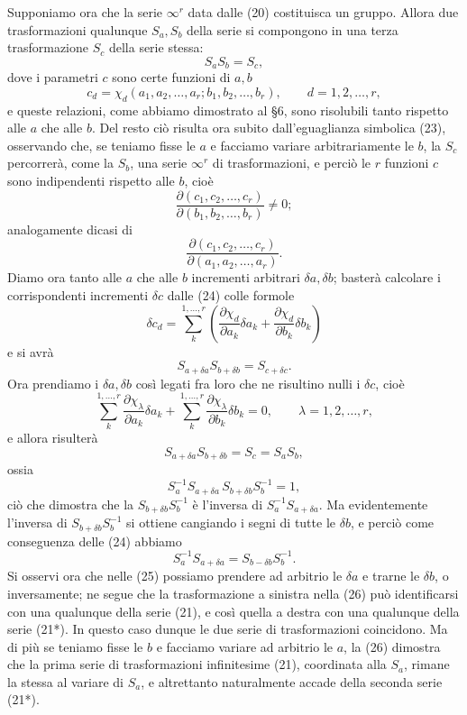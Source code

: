 \documentclass[11pt]{book}
\begin{document}
Supponiamo ora che la serie $\infty^r$ data dalle (20) costituisca un gruppo. Allora due trasformazioni qualunque $S_a,S_b$ della serie si compongono in una terza trasformazione $S_c$ della serie stessa:
\begin{equation*}\tag{23}
 S_aS_b=S_c,
\end{equation*}
dove i parametri $c$ sono certe funzioni di $a,b$
\begin{equation*}\tag{24}
 c_d=\chi_d(a_1,a_2,\ldots,a_r; b_1,b_2,\ldots,b_r),\qquad d=1,2,\ldots,r,
\end{equation*}
e queste relazioni, come abbiamo dimostrato al \S{}6, sono risolubili tanto rispetto alle $a$ che alle $b$. Del resto ciò risulta ora subito dall'eguaglianza simbolica (23), osservando che, se teniamo fisse le $a$ e facciamo variare arbitrariamente le $b$, la $S_c$ percorrerà, come la $S_b$, una serie $\infty^r$ di trasformazioni, e perciò le $r$ funzioni $c$ sono indipendenti rispetto alle $b$, cioè
\[
 \frac{\partial(c_1,c_2,\ldots,c_r)}{\partial(b_1,b_2,\ldots,b_r)}\ne0;
\]
analogamente dicasi di
\[
 \frac{\partial(c_1,c_2,\ldots,c_r)}{\partial(a_1,a_2,\ldots,a_r)}.
\]
Diamo ora tanto alle $a$ che alle $b$ incrementi arbitrari $\delta a,\delta b$; basterà calcolare i corrispondenti incrementi $\delta c$ dalle (24) colle formole
\[
 \delta c_d=\sum\limits_k^{1,\ldots,r}\left(\frac{\partial\chi_d}{\partial a_k}\delta a_k+\frac{\partial\chi_d}{\partial b_k}\delta b_k\right)
\]
e si avrà
\[
 S_{a+\delta a}S_{b+\delta b}=S_{c+\delta c}.
\]
Ora prendiamo i $\delta a,\delta b$ così legati fra loro che ne risultino nulli i $\delta c$, cioè
\begin{equation*}\tag{25}
 \sum\limits_k^{1,\ldots,r}\frac{\partial\chi_\lambda}{\partial a_k}\delta a_k+
 \sum\limits_k^{1,\ldots,r}\frac{\partial\chi_\lambda}{\partial b_k}\delta b_k=0,
 \qquad \lambda=1,2,\ldots,r,
\end{equation*}
e allora risulterà
\[
 S_{a+\delta a}S_{b+\delta b}=S_c=S_aS_b,
\]
ossia
\[
 S_a^{-1}S_{a+\delta a}\, S_{b+\delta b}S_b^{-1}=1,
\]
ciò che dimostra che la $S_{b+\delta b}S_b^{-1}$ è l'inversa di $S_a^{-1}S_{a+\delta a}$. Ma evidentemente l'inversa di $S_{b+\delta b}S_b^{-1}$ si ottiene cangiando i segni di tutte le $\delta b$, e perciò come conseguenza delle (24) abbiamo
\begin{equation*}\tag{26}
 S_a^{-1}S_{a+\delta a}=S_{b-\delta b}S_b^{-1}.
\end{equation*}
Si osservi ora che nelle (25) possiamo prendere ad arbitrio le $\delta a$ e trarne le $\delta b$, o inversamente; ne segue che la trasformazione a sinistra nella (26) può identificarsi con una qualunque della serie (21), e così quella a destra con una qualunque della serie (21*). In questo caso dunque le due serie di trasformazioni coincidono. Ma di più se teniamo fisse le $b$ e facciamo variare ad arbitrio le $a$, la (26) dimostra che la prima serie di trasformazioni infinitesime (21), coordinata alla $S_a$, rimane la stessa al variare di $S_a$, e altrettanto naturalmente accade della seconda serie (21*).
\end{document}
